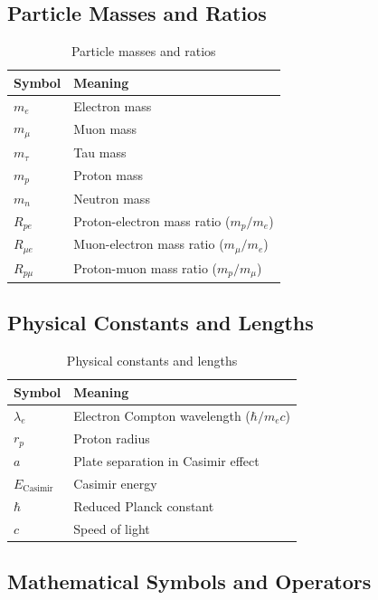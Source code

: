 	\subsection{Particle Masses and Ratios}
	
	\begin{table}[htbp]
		\centering
		\begin{tabular}{p{3cm}p{9cm}}
			\toprule
			\textbf{Symbol} & \textbf{Meaning} \\
			\midrule
			$m_e$ & Electron mass \\
			$m_{\mu}$ & Muon mass \\
			$m_{\tau}$ & Tau mass \\
			$m_p$ & Proton mass \\
			$m_n$ & Neutron mass \\
			$R_{pe}$ & Proton-electron mass ratio ($m_p/m_e$) \\
			$R_{\mu e}$ & Muon-electron mass ratio ($m_{\mu}/m_e$) \\
			$R_{p\mu}$ & Proton-muon mass ratio ($m_p/m_{\mu}$) \\
			\bottomrule
		\end{tabular}
		\caption{Particle masses and ratios}
	\end{table}
	
	\subsection{Physical Constants and Lengths}
	
	\begin{table}[htbp]
		\centering
		\begin{tabular}{p{3cm}p{9cm}}
			\toprule
			\textbf{Symbol} & \textbf{Meaning} \\
			\midrule
			$\lambda_e$ & Electron Compton wavelength ($\hbar/m_e c$) \\
			$r_p$ & Proton radius \\
			$a$ & Plate separation in Casimir effect \\
			$E_{\text{Casimir}}$ & Casimir energy \\
			$\hbar$ & Reduced Planck constant \\
			$c$ & Speed of light \\
			\bottomrule
		\end{tabular}
		\caption{Physical constants and lengths}
	\end{table}
	
	\subsection{Mathematical Symbols and Operators}
	
